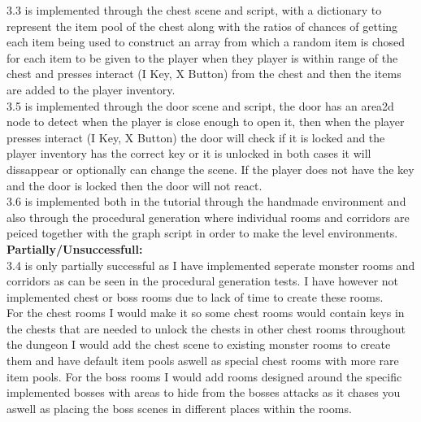 \documentclass{article}
\begin{document}
        3.3 is implemented through the chest scene and script, with a dictionary to represent the item pool of the chest along with the ratios of chances of getting each item being used to construct an array from which a random item is chosed for each item to be given to the player when they player is within range of the chest and presses interact (I Key, X Button) from the chest and then the items are added to the player inventory.\\
        3.5 is implemented through the door scene and script, the door has an area2d node to detect when the player is close enough to open it, then when the player presses interact (I Key, X Button) the door will check if it is locked and the player inventory has the correct key or it is unlocked in both cases it will dissappear or optionally can change the scene. If the player does not have the key and the door is locked then the door will not react.\\
        3.6 is implemented both in the tutorial through the handmade environment and also through the procedural generation where individual rooms and corridors are peiced together with the graph script in order to make the level environments.\\
        \textbf{Partially/Unsuccessfull:}\\
        3.4 is only partially successful as I have implemented seperate monster rooms and corridors as can be seen in the procedural generation tests. I have however not implemented chest or boss rooms due to lack of time to create these rooms.\\
        For the chest rooms I would make it so some chest rooms would contain keys in the chests that are needed to unlock the chests in other chest rooms throughout the dungeon I would add the chest scene to existing monster rooms to create them and have default item pools aswell as special chest rooms with more rare item pools. For the boss rooms I would add rooms designed around the specific implemented bosses with areas to hide from the bosses attacks as it chases you aswell as placing the boss scenes in different places within the rooms.\\
\end{document}
